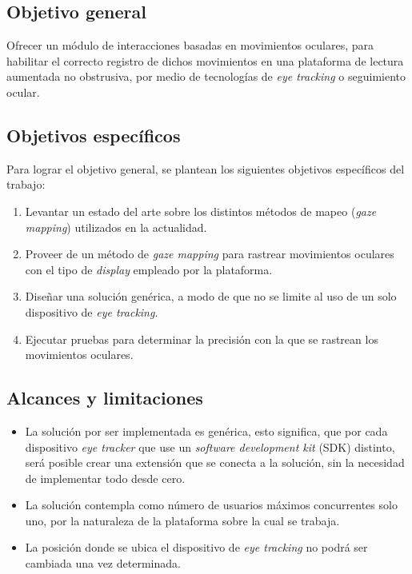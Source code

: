 \subsection{Objetivo general}
Ofrecer un módulo de interacciones basadas en movimientos oculares, para habilitar el correcto registro de dichos movimientos en una plataforma de lectura aumentada no obstrusiva, por medio de tecnologías de \textit{eye tracking} o seguimiento ocular.

\subsection{Objetivos espec\'ificos}
Para lograr el objetivo general, se plantean los siguientes objetivos específicos del trabajo:
\begin{enumerate}
    \item Levantar un estado del arte sobre los distintos métodos de mapeo (\textit{gaze mapping}) utilizados en la actualidad.
    \item Proveer de un método de \textit{gaze mapping} para rastrear movimientos oculares con el tipo de \textit{display} empleado por la plataforma.
    \item Diseñar una solución genérica, a modo de que no se limite al uso de un solo dispositivo de \textit{eye tracking}.
    \item Ejecutar pruebas para determinar la precisión con la que se rastrean los movimientos oculares.
\end{enumerate}

\subsection{Alcances y limitaciones}
\begin{itemize}
    \item La solución por ser implementada es genérica, esto significa, que por cada dispositivo \textit{eye tracker} que use un \textit{software development kit} (SDK) distinto, será posible crear una extensión que se conecta a la solución, sin la necesidad de implementar todo desde cero.
    \item La solución contempla como número de usuarios máximos concurrentes solo uno, por la naturaleza de la plataforma sobre la cual se trabaja.
    \item La posición donde se ubica el dispositivo de \textit{eye tracking} no podrá ser cambiada una vez determinada.
\end{itemize}


